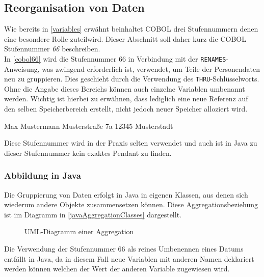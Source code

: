 \subsection{Reorganisation von Daten}

Wie bereits in \autoref{variables} erwähnt beinhaltet COBOL drei Stufennummern denen eine besondere Rolle zuteilwird. Dieser Abschnitt soll daher kurz die COBOL Stufennummer \textit{66} beschreiben.\\

In \autoref{cobol66} wird die Stufennummer 66 in Verbindung mit der \texttt{RENAMES}-Anweisung, was zwingend erforderlich ist, verwendet, um Teile der Personendaten neu zu gruppieren. Dies geschieht durch die Verwendung des \texttt{THRU}-Schlüsselworts. Ohne die Angabe dieses Bereichs können auch einzelne Variablen umbenannt werden. Wichtig ist hierbei zu erwähnen, dass lediglich eine neue Referenz auf den selben Speicherbereich erstellt, nicht jedoch neuer Speicher alloziert wird.

\begin{shellwindow}
Max       Mustermann
Musterstraße  7a   12345 Musterstadt   
\end{shellwindow}

Diese Stufennummer wird in der Praxis selten verwendet und auch ist in Java zu dieser Stufennummer kein exaktes Pendant zu finden. 

\subsubsection*{Abbildung in Java}
Die Gruppierung von Daten erfolgt in Java in eigenen Klassen, aus denen sich wiederum andere Objekte zusammensetzen können. Diese Aggregationsbeziehung ist im Diagramm in \autoref{javaAggregationClasses} dargestellt. \\

\begin{figure}[H]
    \centering
    \caption{UML-Diagramm einer Aggregation}
    \label{javaAggregationClasses}
\end{figure}

Die Verwendung der Stufennummer 66 als reines Umbenennen eines Datums entfällt in Java, da in diesem Fall neue Variablen mit anderen Namen deklariert werden können welchen der Wert der anderen Variable zugewiesen wird.\\